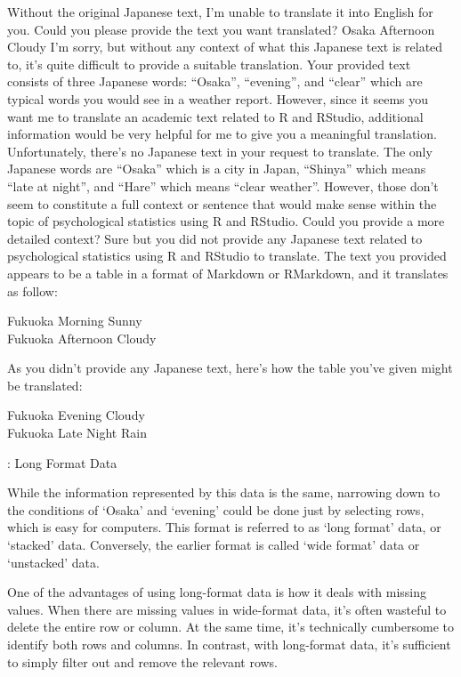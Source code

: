 \documentclass[
  a4paper,
]{book}
\begin{document}
Without the original Japanese text, I'm unable to translate it into
English for you. Could you please provide the text you want translated?
\textbar{} Osaka \textbar{} Afternoon \textbar{} Cloudy \textbar{} I'm
sorry, but without any context of what this Japanese text is related to,
it's quite difficult to provide a suitable translation. Your provided
text consists of three Japanese words: ``Osaka'', ``evening'', and
``clear'' which are typical words you would see in a weather report.
However, since it seems you want me to translate an academic text
related to R and RStudio, additional information would be very helpful
for me to give you a meaningful translation. Unfortunately, there's no
Japanese text in your request to translate. The only Japanese words are
``Osaka'' which is a city in Japan, ``Shinya'' which means ``late at
night'', and ``Hare'' which means ``clear weather''. However, those
don't seem to constitute a full context or sentence that would make
sense within the topic of psychological statistics using R and RStudio.
Could you provide a more detailed context? Sure but you did not provide
any Japanese text related to psychological statistics using R and
RStudio to translate. The text you provided appears to be a table in a
format of Markdown or RMarkdown, and it translates as follow:

Fukuoka \textbar{} Morning \textbar{} Sunny \textbar{}\\
Fukuoka \textbar{} Afternoon \textbar{} Cloudy \textbar{}

As you didn't provide any Japanese text, here's how the table you've
given might be translated:

Fukuoka \textbar{} Evening \textbar{} Cloudy \textbar{}\\
Fukuoka \textbar{} Late Night \textbar{} Rain \textbar{}

: Long Format Data

While the information represented by this data is the same, narrowing
down to the conditions of `Osaka' and `evening' could be done just by
selecting rows, which is easy for computers. This format is referred to
as `long format' data, or `stacked' data. Conversely, the earlier format
is called `wide format' data or `unstacked' data.

One of the advantages of using long-format data is how it deals with
missing values. When there are missing values in wide-format data, it's
often wasteful to delete the entire row or column. At the same time,
it's technically cumbersome to identify both rows and columns. In
contrast, with long-format data, it's sufficient to simply filter out
and remove the relevant rows.
\end{document}
